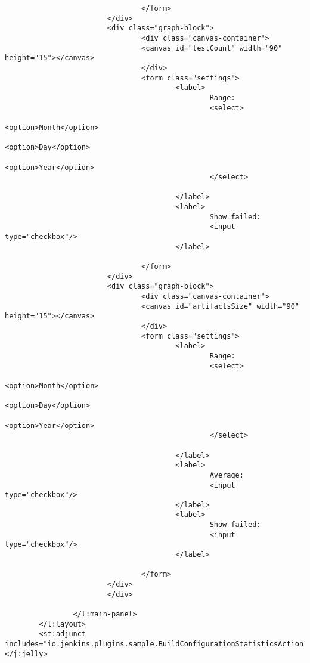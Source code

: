 \begin{lstlisting}
                                </form>
                        </div>
                        <div class="graph-block">
                                <div class="canvas-container">
                                <canvas id="testCount" width="90" height="15"></canvas>
                                </div>
                                <form class="settings">
                                        <label>
                                                Range:
                                                <select>
                                                        <option>Month</option>
                                                        <option>Day</option>
                                                        <option>Year</option>
                                                </select>

                                        </label>
                                        <label>
                                                Show failed:
                                                <input type="checkbox"/>
                                        </label>

                                </form>
                        </div>
                        <div class="graph-block">
                                <div class="canvas-container">
                                <canvas id="artifactsSize" width="90" height="15"></canvas>
                                </div>
                                <form class="settings">
                                        <label>
                                                Range:
                                                <select>
                                                        <option>Month</option>
                                                        <option>Day</option>
                                                        <option>Year</option>
                                                </select>

                                        </label>
                                        <label>
                                                Average:
                                                <input type="checkbox"/>
                                        </label>
                                        <label>
                                                Show failed:
                                                <input type="checkbox"/>
                                        </label>

                                </form>
                        </div>
                        </div>

                </l:main-panel>
        </l:layout>
        <st:adjunct includes="io.jenkins.plugins.sample.BuildConfigurationStatisticsAction.chartLogicBox"/>
</j:jelly>
\end{lstlisting}

